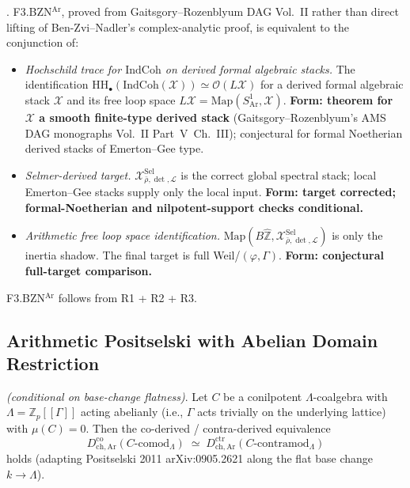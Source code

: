 \begin{theorem}
\label{v4-arith:sw:thm:BZN-Ar-split}
\ClaimStatusProvedHere. F3.BZN\(^{\mathrm{Ar}}\), proved from
Gaitsgory--Rozenblyum DAG Vol.~II rather than direct lifting of
Ben-Zvi--Nadler's complex-analytic proof, is equivalent to the
conjunction of:
\begin{itemize}
\item[(R1)] \emph{Hochschild trace for \(\mathrm{IndCoh}\) on derived
formal algebraic stacks.} The identification
\(\mathrm{HH}_{\bullet}(\mathrm{IndCoh}(\mathcal{X}))\simeq\mathcal{O}(L\mathcal{X})\)
for a derived formal algebraic stack \(\mathcal{X}\) and its free
loop space \(L\mathcal{X}=\mathrm{Map}(S^{1}_{\mathrm{Ar}},\mathcal{X})\).
\textbf{Form: theorem for \(\mathcal{X}\) a smooth finite-type
derived stack} (Gaitsgory--Rozenblyum's AMS DAG monographs Vol.~II
Part~V~Ch.~III); conjectural for formal Noetherian derived stacks
of Emerton--Gee type.
\item[(R2)] \emph{Selmer-derived target.}
\(\mathcal{X}^{\mathrm{Sel}}_{\bar\rho,\det,\mathcal{L}}\) is the
correct global spectral stack; local Emerton--Gee stacks supply only
the local input.
\textbf{Form: target corrected; formal-Noetherian and
nilpotent-support checks conditional.}
\item[(R3)] \emph{Arithmetic free loop space identification.}
\(\mathrm{Map}(B\widehat{\mathbb{Z}},\mathcal{X}^{\mathrm{Sel}}_{\bar\rho,\det,\mathcal{L}})\)
is only the inertia shadow. The final target is full
Weil/\((\varphi,\Gamma)\).
\textbf{Form: conjectural full-target comparison.}
\end{itemize}
F3.BZN\(^{\mathrm{Ar}}\) follows from R1 + R2 + R3.
\end{theorem}

\subsection{Arithmetic Positselski with Abelian Domain Restriction}

\begin{theorem}
\label{v4-arith:sw:thm:PosAr-Heisenberg}
\ClaimStatusProvedHereConditional \emph{(conditional on base-change
flatness)}. Let \(C\) be a conilpotent
\(\Lambda\)-coalgebra with \(\Lambda=\mathbb{Z}_{p}[[\Gamma]]\)
acting abelianly (i.e., \(\Gamma\) acts trivially on the underlying
lattice) with \(\mu(C)=0\). Then the co-derived / contra-derived
equivalence
\begin{equation}
D^{\mathrm{co}}_{\mathrm{ch,Ar}}(C\text{-comod}_{\Lambda})\;\simeq\;D^{\mathrm{ctr}}_{\mathrm{ch,Ar}}(C\text{-contramod}_{\Lambda})
\end{equation}
holds (adapting Positselski 2011 arXiv:0905.2621 along the flat
base change \(k\to\Lambda\)).
\end{theorem}

